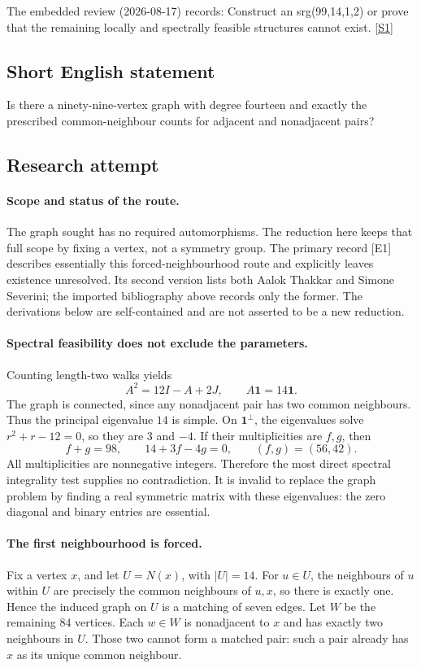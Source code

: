 \documentclass[11pt,a4paper]{article}
\newcommand{\sref}[2]{\hyperlink{source:#1:#2}{[S#2]}}
\begin{document}
The embedded review (2026-08-17) records: Construct an srg(99,14,1,2) or prove that the remaining locally and spectrally feasible structures cannot exist. \sref{1411}{1}

\subsection{Short English statement}

Is there a ninety-nine-vertex graph with degree fourteen and exactly the prescribed common-neighbour counts for adjacent and nonadjacent pairs?

\subsection{Research attempt}

\paragraph{Scope and status of the route.}
The graph sought has no required automorphisms. The reduction here keeps
that full scope by fixing a vertex, not a symmetry group. The primary
record [E1] describes essentially this forced-neighbourhood route and
explicitly leaves existence unresolved. Its second version lists both
Aalok Thakkar and Simone Severini; the imported bibliography above
records only the former. The derivations below are self-contained and
are not asserted to be a new reduction.

\paragraph{Spectral feasibility does not exclude the parameters.}
Counting length-two walks yields
\[
                 A^2=12I-A+2J,\qquad A\mathbf1=14\mathbf1.
\]
The graph is connected, since any nonadjacent pair has two common
neighbours. Thus the principal eigenvalue $14$ is simple. On
$\mathbf1^\perp$, the eigenvalues solve $r^2+r-12=0$, so they are
$3$ and $-4$. If their multiplicities are $f,g$, then
\[
             f+g=98,\qquad 14+3f-4g=0,
             \qquad (f,g)=(56,42).
\]
All multiplicities are nonnegative integers. Therefore the most direct
spectral integrality test supplies no contradiction. It is invalid to
replace the graph problem by finding a real symmetric matrix with
these eigenvalues: the zero diagonal and binary entries are essential.

\paragraph{The first neighbourhood is forced.}
Fix a vertex $x$, and let $U=N(x)$, with $|U|=14$. For $u\in U$,
the neighbours of $u$ within $U$ are precisely the common neighbours
of $u,x$, so there is exactly one. Hence the induced graph on $U$ is
a matching of seven edges. Let $W$ be the remaining $84$ vertices.
Each $w\in W$ is nonadjacent to $x$ and has exactly two neighbours
in $U$. Those two cannot form a matched pair: such a pair already has
$x$ as its unique common neighbour.
\end{document}
